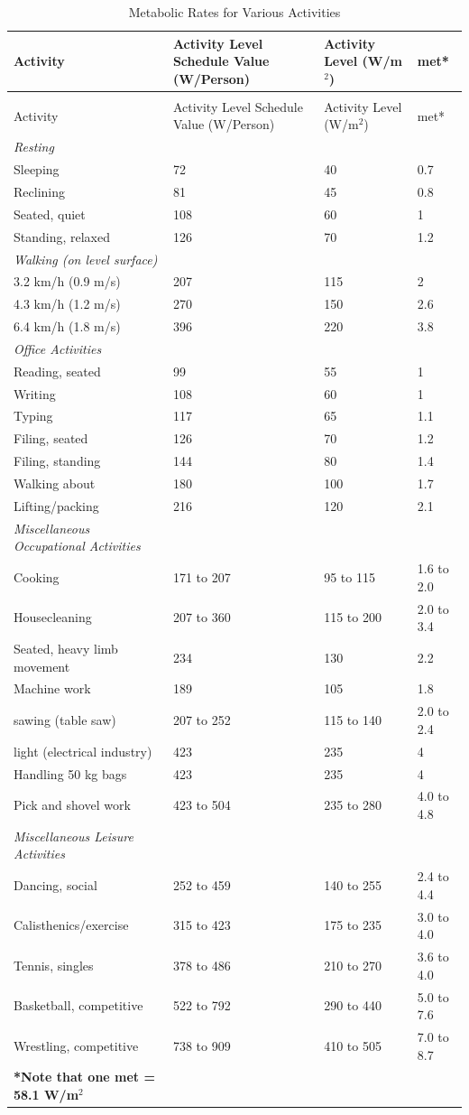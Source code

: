\begin{longtable}[c]{p{2.0in}p{2.0in}p{1.2in}p{0.8in}}
\caption{Metabolic Rates for Various Activities \label{table:metabolic-rates-for-various-activities}} \tabularnewline
\toprule
    Activity & Activity Level \newline Schedule Value (W/Person) & Activity Level \newline (W/m\(^2\)) & met* \tabularnewline
\midrule
\endfirsthead

\caption[]{Metabolic Rates for Various Activities} \tabularnewline
\toprule
    Activity & Activity Level \newline Schedule Value (W/Person) & Activity Level \newline (W/m\(^2\)) & met* \tabularnewline
\midrule
\endhead

\emph{Resting} \tabularnewline \midrule
Sleeping & 72 & 40 & 0.7 \tabularnewline
Reclining & 81 & 45 & 0.8 \tabularnewline
Seated, quiet & 108 & 60 & 1 \tabularnewline
Standing, relaxed & 126 & 70 & 1.2 \tabularnewline
\emph{Walking (on level surface)} \tabularnewline \midrule
3.2 km/h (0.9 m/s) & 207 & 115 & 2 \tabularnewline
4.3 km/h (1.2 m/s) & 270 & 150 & 2.6 \tabularnewline
6.4 km/h (1.8 m/s) & 396 & 220 & 3.8 \tabularnewline
\emph{Office Activities} \tabularnewline \midrule
Reading, seated & 99 & 55 & 1 \tabularnewline
Writing & 108 & 60 & 1 \tabularnewline
Typing & 117 & 65 & 1.1 \tabularnewline
Filing, seated & 126 & 70 & 1.2 \tabularnewline
Filing, standing & 144 & 80 & 1.4 \tabularnewline
Walking about & 180 & 100 & 1.7 \tabularnewline
Lifting/packing & 216 & 120 & 2.1 \tabularnewline
\emph{Miscellaneous Occupational Activities} \tabularnewline \midrule
Cooking & 171 to 207 & 95 to 115 & 1.6 to 2.0 \tabularnewline
Housecleaning & 207 to 360 & 115 to 200 & 2.0 to 3.4 \tabularnewline
Seated, heavy limb movement & 234 & 130 & 2.2 \tabularnewline
Machine work & 189 & 105 & 1.8 \tabularnewline
sawing (table saw) & 207 to 252 & 115 to 140 & 2.0 to 2.4 \tabularnewline
light (electrical industry) & 423 & 235 & 4 \tabularnewline
Handling 50 kg bags & 423 & 235 & 4 \tabularnewline
Pick and shovel work & 423 to 504 & 235 to 280 & 4.0 to 4.8 \tabularnewline
\emph{Miscellaneous Leisure Activities} \tabularnewline \midrule
Dancing, social & 252 to 459 & 140 to 255 & 2.4 to 4.4 \tabularnewline
Calisthenics/exercise & 315 to 423 & 175 to 235 & 3.0 to 4.0 \tabularnewline
Tennis, singles & 378 to 486 & 210 to 270 & 3.6 to 4.0 \tabularnewline
Basketball, competitive & 522 to 792 & 290 to 440 & 5.0 to 7.6 \tabularnewline
Wrestling, competitive & 738 to 909 & 410 to 505 & 7.0 to 8.7 \tabularnewline
\bottomrule
\scriptsize
\textbf{*Note that one met = 58.1 W/m\(^{2}\)}
\end{longtable}

